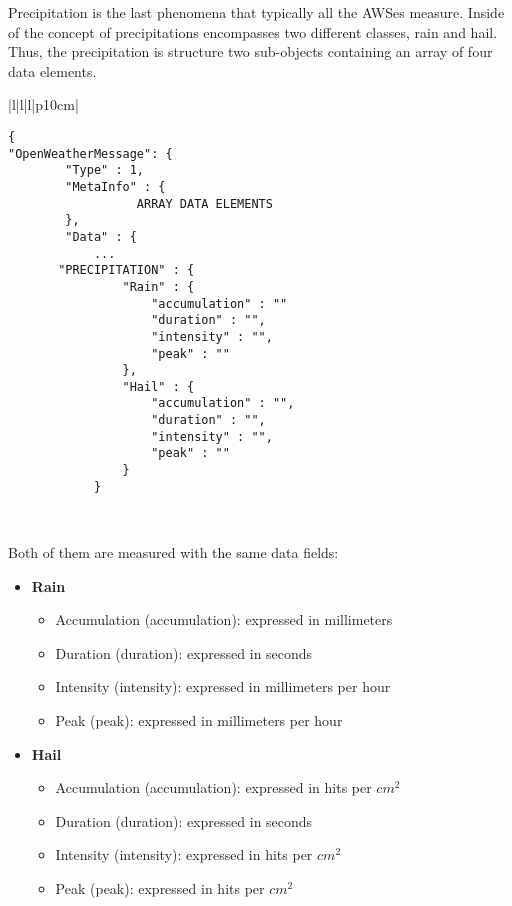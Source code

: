 Precipitation is the last phenomena that typically all the \gls{AWS}es measure. Inside of the concept of precipitations encompasses two different classes, rain and hail. Thus, the precipitation is structure two sub-objects containing an array of four data elements.

\begin{table}[H]
\centering
\begin{tabular}{|l|l|l|p{10cm}|}
\hline
\begin{minipage}[t]{\linewidth}
	\begin{verbatim}
{
"OpenWeatherMessage": {
        "Type" : 1,
        "MetaInfo" : {
	              ARRAY DATA ELEMENTS
        },
        "Data" : {
            ...
       "PRECIPITATION" : {
                "Rain" : {
                    "accumulation" : ""
                    "duration" : "", 
                    "intensity" : "", 
                    "peak" : "" 
                },
                "Hail" : {
                    "accumulation" : "", 
                    "duration" : "", 
                    "intensity" : "",
                    "peak" : ""
                }
            }
      \end{verbatim}
\end{minipage} \\
\hline
\end{tabular}
\caption{Precipitation data field in a data message of OpenWeather protocol.}
\end{table}

Both of them are measured with the same data fields:

\begin{itemize}
\item \textbf{Rain}
	\begin{itemize}
	\item Accumulation  (accumulation): expressed in millimeters
	\item Duration   (duration): expressed in seconds
	\item Intensity   (intensity): expressed in millimeters per hour
	\item Peak   (peak): expressed in millimeters per hour
	\end{itemize}
\item \textbf{Hail}
	\begin{itemize}
	\item Accumulation  (accumulation): expressed in hits per $cm^2$
	\item Duration   (duration): expressed in seconds
	\item Intensity   (intensity): expressed in hits per $cm^2$
	\item Peak   (peak): expressed in hits per $cm^2$
	\end{itemize}
\end{itemize}

